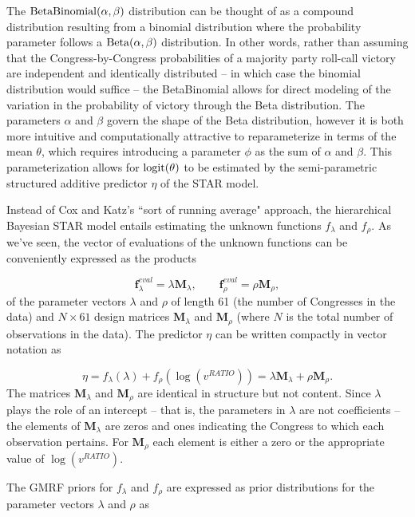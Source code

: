 The ${\rm BetaBinomial}(\alpha,\beta)$ distribution can be thought of as a compound distribution resulting from a binomial distribution where the probability parameter follows a ${\rm Beta}(\alpha,\beta)$ distribution. In other words, rather than assuming that the Congress-by-Congress probabilities of a majority party roll-call victory are independent and identically distributed -- in which case the binomial distribution would suffice -- the BetaBinomial  allows for direct modeling of the variation in the probability of victory through the Beta distribution. The parameters $\alpha$ and $\beta$ govern the shape of the Beta distribution, however it is both more intuitive and computationally attractive to reparameterize in terms of the mean $\theta$, which requires introducing a parameter $\phi$ as the sum of $\alpha$ and $\beta$.  This parameterization allows for ${\rm logit}(\theta)$ to be estimated by the semi-parametric structured additive predictor $\eta$ of the STAR model. 

Instead of Cox and Katz's ``sort of running average" approach, the hierarchical Bayesian STAR model entails estimating the unknown functions $f_\lambda$ and $f_\rho$. As we've seen, the vector of evaluations of the unknown functions can be conveniently expressed as the products 

{\singlespacing
$$
\mathbf{f}^{eval}_\lambda = \lambda \mathbf{M}_\lambda, 
\qquad 
\mathbf{f}^{eval}_\rho = \rho \mathbf{M}_\rho, 
$$
}
%
\noindent of the parameter vectors $\lambda$ and $\rho$ of length 61 (the number of Congresses in the data) and  $N \times 61$ design matrices  $\mathbf{M}_\lambda$ and  $\mathbf{M}_\rho$ (where $N$ is the total number of observations in the data). The predictor $\eta$ can be written compactly in vector notation as 

{\singlespacing
$$ \eta = f_\lambda(\lambda) +  f_\rho(\log{(v^{RATIO})}) = \lambda \mathbf{M}_\lambda + \rho \mathbf{M}_\rho.$$
}
%
\indent The matrices $\mathbf{M}_\lambda$ and $\mathbf{M}_\rho$ are identical in structure but not content. Since $\lambda$ plays the role of an intercept -- that is, the parameters in $\lambda$ are not coefficients -- the elements of $\mathbf{M}_\lambda$ are zeros and ones indicating the Congress to which each observation pertains. For $\mathbf{M}_\rho$ each element is either a zero or the appropriate value of $\log{(v^{RATIO})}$. 


The GMRF priors for $f_{\lambda}$ and $f_{\rho}$ are expressed as prior distributions for the parameter vectors $\lambda$ and $\rho$ as 

